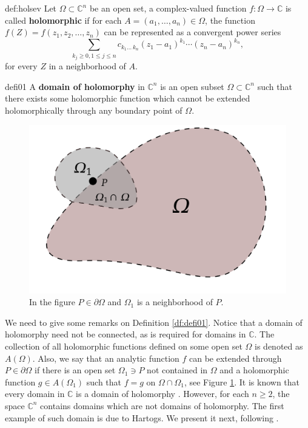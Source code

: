 \begin{mydef}{}{def:holsev}
Let $\Omega \subset \mathbb{C}^n$ be an open set, a complex-valued function $f:\Omega \rightarrow \mathbb{C}$ is called {\bf holomorphic} if for each $A=(a_1,\dots,a_n)\in \Omega$, the function $f(Z)=f(z_1,z_2,\dots,z_n)$ can be represented as a convergent power series
$$\sum_{k_j \geq 0,1\leq j\leq n} c_{k_1\dots\, k_n}(z_1-a_1)^{k_1}\cdots (z_n-a_n)^{k_n},$$
for every $Z$ in a neighborhood of $A$.
\end{mydef}

\begin{mydef}{}{defi01}
A {\bf domain of holomorphy} in $\mathbb{C}^n$ is an open subset $\Omega\subset \mathbb{C}^n$ such that there exists some holomorphic function which cannot be extended holomorphically through any boundary point of $\Omega$.
\end{mydef}

\begin{figure}[h!]
  \centering
  \includegraphics[scale=.2]{d001}
  \caption{In the figure $P\in \partial \Omega$ and $\Omega_1$ is a neighborhood of $P$.}
  \label{fig:dominiofront}
\end{figure}

We need to give some remarks on Definition \ref{df:defi01}. Notice that a domain of holomorphy need not be connected, as is required for domains in $\mathbb{C}$. The collection of all holomorphic functions defined on some open set $\Omega$ is denoted as $A(\Omega)$. Also, we say that an analytic function $f$ can be extended through $P\in \partial \Omega$ if there is an open set $\Omega_1\ni P$ not contained in $\Omega$ and a holomorphic function $g\in A(\Omega_1)$ such that $f=g$ on $\Omega\cap \Omega_1$, see Figure \ref{fig:dominiofront}. It is known that every domain in $\mathbb{C}$ is a domain of holomorphy \cite[Chapter G]{gunning}. However, for each $n\geq 2$, the space $\mathbb{C}^n$ contains domains which are not domains of holomorphy. The first example of such domain is due to Hartogs. We present it next, following \cite{range}.\\

